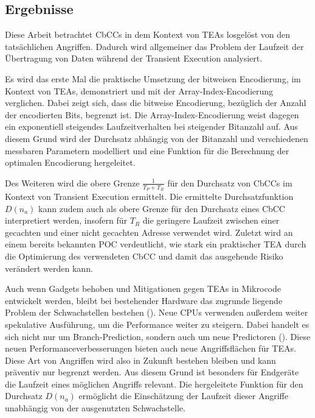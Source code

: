 
\subsection{Ergebnisse}
Diese Arbeit betrachtet \acp{CbCC} in dem Kontext von
\acp{TEA} losgelöst von den tatsächlichen Angriffen.
Dadurch wird allgemeiner das Problem der Laufzeit der
Übertragung von Daten während der Transient Execution
analysiert.

Es wird das erste Mal die praktische Umsetzung
der bitweisen Encodierung, im Kontext von \acp{TEA},
demonstriert und mit der Array-Index-Encodierung verglichen.
Dabei zeigt sich, dass die bitweise Encodierung, bezüglich
der Anzahl der encodierten Bits, begrenzt ist.
Die Array-Index-Encodierung weist dagegen ein exponentiell
steigendes Laufzeitverhalten bei steigender Bitanzahl auf.
Aus diesem Grund wird der Durchsatz abhängig von der Bitanzahl
und verschiedenen messbaren Parametern modelliert und eine
Funktion für die Berechnung der optimalen Encodierung
hergeleitet.

Des Weiteren wird die obere Grenze
$\frac{1}{T_P+T_R}$ für den Durchsatz von \acp{CbCC} im Kontext
von Transient Execution ermittelt. Die ermittelte
Durchsatzfunktion $D(n_a)$ kann zudem auch als obere Grenze für
den Durchsatz eines \ac{CbCC} interpretiert werden, insofern für
$T_R$ die geringere Laufzeit zwischen einer gecachten und einer
nicht gecachten Adresse verwendet wird.
Zuletzt wird an einem bereits bekannten \ac{POC} verdeutlicht, wie
stark ein praktischer \ac{TEA} durch die Optimierung des
verwendeten \ac{CbCC} und damit das ausgehende Risiko verändert
werden kann.

Auch wenn Gadgets behoben und Mitigationen gegen
\acp{TEA} in Mikrocode entwickelt werden, bleibt bei
bestehender Hardware das zugrunde liegende Problem der
Schwachstellen bestehen (\cite[3,10]{hertogh_rain_nodate}).
Neue \acp{CPU} verwenden außerdem weiter spekulative
Ausführung, um die Performance weiter zu steigern. Dabei
handelt es sich nicht nur um Branch-Prediction, sondern auch
um neue Predictoren (\cite[5]{kim_slap_2025}). Diese neuen
Performanceverbesserungen bieten auch neue Angriffsflächen
für \acp{TEA}. Diese Art von Angriffen wird also in Zukunft
bestehen bleiben und kann präventiv nur begrenzt werden.
Aus diesem Grund ist besonders für Endgeräte die Laufzeit
eines möglichen Angriffs relevant. Die hergeleitete Funktion
für den Durchsatz $D(n_a)$ ermöglicht die Einschätzung
der Laufzeit dieser Angriffe unabhängig von der ausgenutzten
Schwachstelle.

